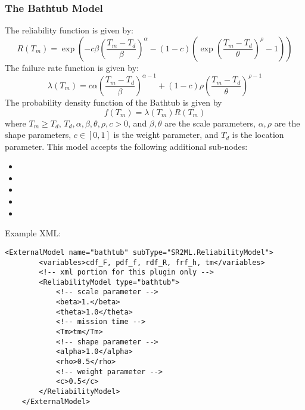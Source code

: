 \subsubsection{The Bathtub Model}
The reliability function is given by:
\begin{equation}
  R(T_m) = \exp\left(-c\beta\left(\frac{T_m-T_d}{\beta}\right)^\alpha -(1-c)\left(\exp\left(\frac{T_m-T_d}{\theta}\right)^\rho -1\right)\right)
\end{equation}
The failure rate function is given by:
\begin{equation}
  \lambda(T_m) = c\alpha\left(\frac{T_m-T_d}{\beta}\right)^{\alpha-1}+(1-c)\rho\left(\frac{T_m-T_d}{\theta}\right)^{\rho-1}
\end{equation}
The probability density function of the Bathtub is given by
\begin{equation}
	f(T_m) = \lambda(T_m) R(T_m)
\end{equation}
where $T_m\geq T_d$, $T_d, \alpha, \beta, \theta, \rho, c >0$, and $\beta, \theta$ are the scale parameters,
$\alpha, \rho$ are the shape parameters, $c \in [0,1]$ is the weight parameter, and $T_d$ is the location parameter.
This model accepts the following additional sub-nodes:
\begin{itemize}
	\item {}
	\item {}
	\item {}
	\item {}
	\item {}
\end{itemize}

Example XML:
\begin{lstlisting}[style=XML]
	<ExternalModel name="bathtub" subType="SR2ML.ReliabilityModel">
		<variables>cdf_F, pdf_f, rdf_R, frf_h, tm</variables>
		<!-- xml portion for this plugin only -->
		<ReliabilityModel type="bathtub">
			<!-- scale parameter -->
			<beta>1.</beta>
			<theta>1.0</theta>
			<!-- mission time -->
			<Tm>tm</Tm>
			<!-- shape parameter -->
			<alpha>1.0</alpha>
			<rho>0.5</rho>
			<!-- weight parameter -->
			<c>0.5</c>
		</ReliabilityModel>
	</ExternalModel>
\end{lstlisting}


